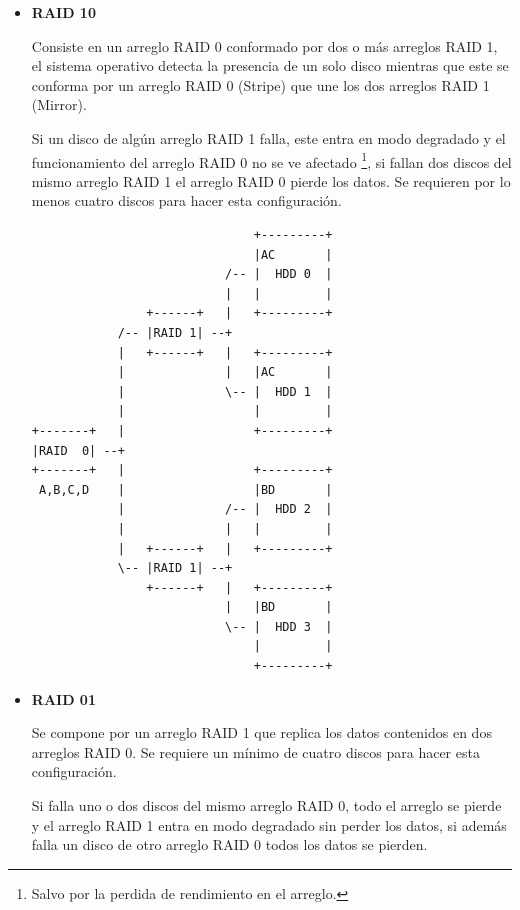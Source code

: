 \begin{itemize}

  \item \textbf{RAID 10}

Consiste en un arreglo RAID 0 conformado por dos o m\'{a}s arreglos RAID 1, el sistema operativo detecta la presencia de un solo disco mientras que este se conforma por un arreglo RAID 0 (Stripe) que une los dos arreglos RAID 1 (Mirror).

Si un disco de alg\'{u}n arreglo RAID 1 falla, este entra en modo degradado y el funcionamiento del arreglo RAID 0 no se ve afectado \footnote{Salvo por la perdida de rendimiento en el arreglo.}, si fallan dos discos del mismo arreglo RAID 1 el arreglo RAID 0 pierde los datos. Se requieren por lo menos cuatro discos para hacer esta configuraci\'{o}n.

{
\scriptsize
\linespread{1}
\begin{verbatim}
                               +---------+
                               |AC       |
                           /-- |  HDD 0  |
                           |   |         |
                +------+   |   +---------+
            /-- |RAID 1| --+
            |   +------+   |   +---------+
            |              |   |AC       |
            |              \-- |  HDD 1  |
            |                  |         |
+-------+   |                  +---------+
|RAID  0| --+
+-------+   |                  +---------+
 A,B,C,D    |                  |BD       |
            |              /-- |  HDD 2  |
            |              |   |         |
            |   +------+   |   +---------+
            \-- |RAID 1| --+
                +------+   |   +---------+
                           |   |BD       |
                           \-- |  HDD 3  |
                               |         |
                               +---------+
\end{verbatim}
}

  \item \textbf{RAID 01}

Se compone por un arreglo RAID 1 que replica los datos contenidos en dos arreglos RAID 0. Se requiere un m\'{i}nimo de cuatro discos para hacer esta configuraci\'{o}n.

Si falla uno o dos discos del mismo arreglo RAID 0, todo el arreglo se pierde y el arreglo RAID 1 entra en modo degradado sin perder los datos, si adem\'{a}s falla un disco de otro arreglo RAID 0 todos los datos se pierden.
  

\end{itemize}
